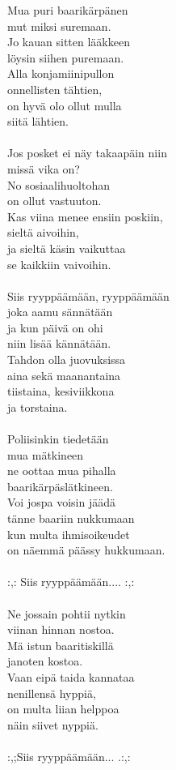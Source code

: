 
Mua puri baarikärpänen \\ mut miksi suremaan. \\ Jo kauan sitten lääkkeen \\ löysin siihen puremaan. \\ Alla konjamiinipullon \\ onnellisten tähtien, \\ on hyvä olo ollut mulla \\ siitä lähtien. \\ \hspace{10mm} \\ Jos posket ei näy takaapäin niin \\ missä vika on? \\ No sosiaalihuoltohan \\ on ollut vastuuton. \\ Kas viina menee ensiin poskiin, \\ sieltä aivoihin, \\ ja sieltä käsin vaikuttaa \\ se kaikkiin vaivoihin. \\ \hspace{10mm} \\ Siis ryyppäämään, ryyppäämään \\ joka aamu sännätään \\ ja kun päivä on ohi \\ niin lisää kännätään. \\ Tahdon olla juovuksissa \\ aina sekä maanantaina \\ tiistaina, kesiviikkona \\ ja torstaina. \\ \hspace{10mm} \\ Poliisinkin tiedetään \\ mua mätkineen \\ ne oottaa mua pihalla \\ baarikärpäslätkineen. \\ Voi jospa voisin jäädä \\ tänne baariin nukkumaan \\ kun multa ihmisoikeudet \\ on näemmä päässy hukkumaan. \\ \hspace{10mm} \\ :,: Siis ryyppäämään.... :,: \\ \hspace{10mm} \\ Ne jossain pohtii nytkin \\ viinan hinnan nostoa. \\ Mä istun baaritiskillä \\ janoten kostoa. \\ Vaan eipä taida kannataa \\ nenillensä hyppiä, \\ on multa liian helppoa \\ näin siivet nyppiä. \\ \hspace{10mm} \\ :,;Siis ryyppäämään... .:,: